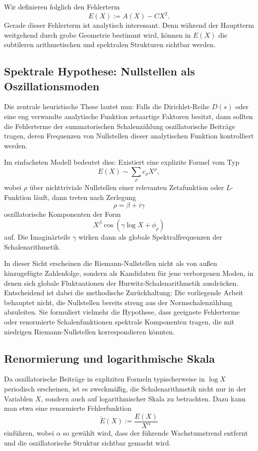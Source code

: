 \documentclass[a4paper,12pt]{article}
\theoremstyle{definition}
\numberwithin{equation}{section}
\begin{document}
	Wir definieren folglich den Fehlerterm
	\[
	E(X) := A(X) - C X^2.
	\]
	Gerade dieser Fehlerterm ist analytisch interessant. Denn während der Hauptterm weitgehend durch grobe Geometrie bestimmt wird, können in $E(X)$ die subtileren arithmetischen und spektralen Strukturen sichtbar werden.
	
	\subsection{Spektrale Hypothese: Nullstellen als Oszillationsmoden}
	
	Die zentrale heuristische These lautet nun: Falls die Dirichlet-Reihe $D(s)$ oder eine eng verwandte analytische Funktion zetaartige Faktoren besitzt, dann sollten die Fehlerterme der summatorischen Schalenzählung oszillatorische Beiträge tragen, deren Frequenzen von Nullstellen dieser analytischen Funktion kontrolliert werden.
	
	Im einfachsten Modell bedeutet dies: Existiert eine explizite Formel vom Typ
	\[
	E(X) \sim \sum_{\rho} c_\rho X^\rho,
	\]
	wobei $\rho$ über nichttriviale Nullstellen einer relevanten Zetafunktion oder $L$-Funktion läuft, dann treten nach Zerlegung
	\[
	\rho = \beta + i\gamma
	\]
	oszillatorische Komponenten der Form
	\[
	X^\beta \cos(\gamma \log X + \phi_\rho)
	\]
	auf. Die Imaginärteile $\gamma$ wirken dann als globale Spektralfrequenzen der Schalenarithmetik.
	
	In dieser Sicht erscheinen die Riemann-Nullstellen nicht als von außen hinzugefügte Zahlenfolge, sondern als Kandidaten für jene verborgenen Moden, in denen sich globale Fluktuationen der Hurwitz-Schalenarithmetik ausdrücken. Entscheidend ist dabei die methodische Zurückhaltung: Die vorliegende Arbeit behauptet nicht, die Nullstellen bereits streng aus der Normschalenzählung abzuleiten. Sie formuliert vielmehr die Hypothese, dass geeignete Fehlerterme oder renormierte Schalenfunktionen spektrale Komponenten tragen, die mit niedrigen Riemann-Nullstellen korrespondieren könnten.
	
	\subsection{Renormierung und logarithmische Skala}
	
	Da oszillatorische Beiträge in expliziten Formeln typischerweise in $\log X$ periodisch erscheinen, ist es zweckmäßig, die Schalenarithmetik nicht nur in der Variablen $X$, sondern auch auf logarithmischer Skala zu betrachten. Dazu kann man etwa eine renormierte Fehlerfunktion
	\[
	\widetilde E(X) := \frac{E(X)}{X^\alpha}
	\]
	einführen, wobei $\alpha$ so gewählt wird, dass der führende Wachstumstrend entfernt und die oszillatorische Struktur sichtbar gemacht wird.
	
\end{document}
